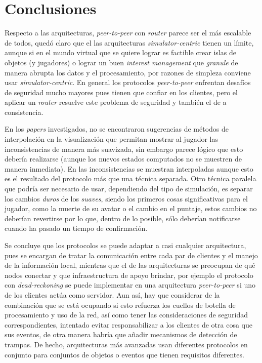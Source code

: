 \section{Conclusiones}

Respecto a las arquitecturas, \emph{peer-to-peer} con \emph{router} parece ser el más escalable de todos, quedó claro que el las arquitecturas \emph{simulator-centric} tienen un límite, aunque si en el mundo virtual que se quiere lograr es factible crear islas de objetos (y jugadores) o lograr un buen \emph{interest management} que \emph{granule} de manera abrupta los datos y el procesamiento, por razones de simpleza conviene usar \emph{simulator-centric}. En general los protocolos \emph{peer-to-peer} enfrentan desafíos de seguridad mucho mayores pues tienen que confiar en los clientes, pero el aplicar un \emph{router} resuelve este problema de seguridad y también el de a consistencia.

En los \emph{papers} investigados, no se encontraron sugerencias de métodos de interpolación en la visualización que permitan mostrar al jugador las inconsistencias de manera más suavizada, sin embargo parece lógico que esto debería realizarse (aunque los nuevos estados computados no se muestren de manera inmediata). En \cite{li2004supporting} las inconsistencias se muestran interpoladas aunque esto es el resultado del protocolo más que una técnica separada. Otro técnica paralela que podría ser necesario de usar, dependiendo del tipo de simulación, es separar los cambios \emph{duros} de los \emph{suaves}, siendo los primeros cosas significativas para el jugador, como la muerte de su avatar o el cambio en el puntaje, estos cambios no deberían revertirse por lo que, dentro de lo posible, sólo deberían notificarse cuando ha pasado un tiempo de confirmación.

Se concluye que los protocolos se puede adaptar a casi cualquier arquitectura, pues se encargan de tratar la comunicación entre cada par de clientes y el manejo de la información local, mientras que el de las arquitecturas se preocupan de qué nodos conectar y que infraestructura de apoyo brindar, por ejemplo el protocolo con \emph{dead-reckoning} se puede implementar en una arquitectura \emph{peer-to-peer} si uno de los clientes actúa como servidor. Aun así, hay que considerar de la combinación que se está ocupando si esto refuerza los cuellos de botella de procesamiento y uso de la red, así como tener las consideraciones de seguridad correspondientes, intentado evitar responsabilizar a los clientes de otra cosa que sus eventos, de otra manera habría que añadir mecanismos de detección de trampas. De hecho, arquitecturas más avanzadas usan diferentes protocolos en conjunto para conjuntos de objetos o eventos que tienen requisitos diferentes.

